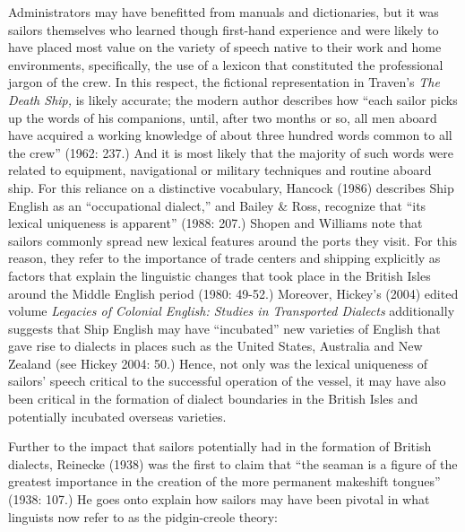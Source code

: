\begin{styleStandard}
Administrators may have benefitted from manuals and dictionaries, but it was sailors themselves who learned though first-hand experience and were likely to have placed most value on the variety of speech native to their work and home environments, specifically, the use of a lexicon that constituted the professional jargon of the crew. In this respect, the fictional representation in Traven’s \textit{The Death Ship, }is likely accurate; the modern author describes how “each sailor picks up the words of his companions, until, after two months or so, all men aboard have acquired a working knowledge of about three hundred words common to all the crew” (1962: 237.) And it is most likely that the majority of such words were related to equipment, navigational or military techniques and routine aboard ship. For this reliance on a distinctive vocabulary, Hancock (1986) describes Ship English as an “occupational dialect,” and Bailey \& Ross, recognize that “its lexical uniqueness is apparent” (1988: 207.) Shopen and Williams note that sailors commonly spread new lexical features around the ports they visit. For this reason, they refer to the importance of trade centers and shipping explicitly as factors that explain the linguistic changes that took place in the British Isles around the Middle English period (1980: 49-52.) Moreover, Hickey’s (2004) edited volume \textit{Legacies of Colonial English: Studies in Transported Dialects} additionally suggests that Ship English may have “incubated” new varieties of English that gave rise to dialects in places such as the United States, Australia and New Zealand (see Hickey 2004: 50.) Hence, not only was the lexical uniqueness of sailors’ speech critical to the successful operation of the vessel, it may have also been critical in the formation of dialect boundaries in the British Isles and potentially incubated overseas varieties.
\end{styleStandard}


\begin{styleStandard}
Further to the impact that sailors potentially had in the formation of British dialects, Reinecke (1938) was the first to claim that “the seaman is a figure of the greatest importance in the creation of the more permanent makeshift tongues” (1938: 107.) He goes onto explain how sailors may have been pivotal in what linguists now refer to as the pidgin-creole theory:
\end{styleStandard}


